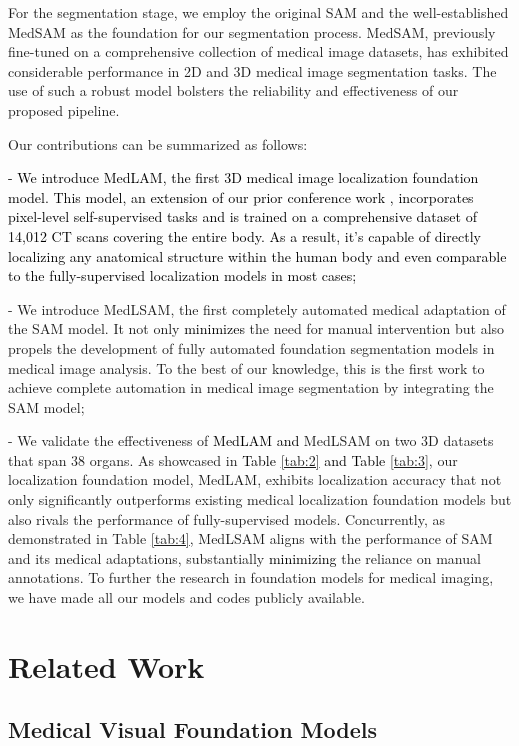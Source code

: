 \documentclass[times,twocolumn,final]{elsarticle}
\begin{document}
For the segmentation stage, we employ the original SAM and the well-established MedSAM \citep{MedSAM} as the foundation for our segmentation process. MedSAM, previously fine-tuned on a comprehensive collection of medical image datasets, has exhibited considerable performance in 2D and 3D medical image segmentation tasks. The use of such a robust model bolsters the reliability and effectiveness of our proposed pipeline.

Our contributions can be summarized as follows:
\par \textcolor{black}{-  We introduce MedLAM, the first 3D medical image localization foundation model. This model, an extension of our prior conference work \citep{lei2021contrastive}, incorporates pixel-level self-supervised tasks and is trained on a comprehensive dataset of 14,012 CT scans covering the entire body. As a result, it's capable of directly localizing any anatomical structure within the human body and even comparable to the fully-supervised localization models in most cases;} 
\par - We introduce MedLSAM, the first completely automated medical adaptation of the SAM model. It not only \textcolor{black}{minimizes} the need for manual intervention but also propels the development of fully automated foundation segmentation models in medical image analysis. To the best of our knowledge, this is the first work to achieve complete automation in medical image segmentation by integrating the SAM model;
\par - We validate the effectiveness of \textcolor{black}{MedLAM and} MedLSAM on two 3D datasets that span 38 organs. As showcased in \textcolor{black}{Table \ref{tab:2} and Table \ref{tab:3}}, our localization foundation model, MedLAM, exhibits localization accuracy that not only significantly outperforms existing medical localization foundation models but also rivals the performance of fully-supervised models. Concurrently, as demonstrated in Table \ref{tab:4}, MedLSAM aligns with the performance of SAM and its medical adaptations, substantially \textcolor{black}{minimizing} the reliance on manual annotations. To further the research in foundation models for medical imaging, we have made all our models and codes publicly available.

\section{Related Work}
\subsection{Medical Visual Foundation Models}
\end{document}
